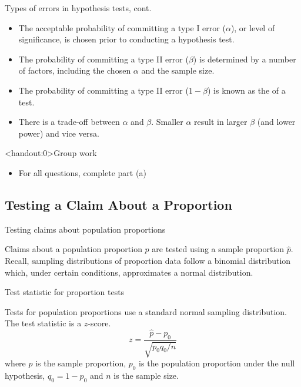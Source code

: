 \documentclass[xcolor=table, handout]{beamer}
\begin{document}
\begin{frame}{Types of errors in hypothesis tests, cont.}
\begin{block}{}
\large
\begin{itemize}
\item The acceptable probability of committing a type I error ($\alpha$), or level of significance,  is chosen prior to conducting a hypothesis test.
\pause\item The probability of committing a type II error ($\beta$) is determined by a number of factors, including the chosen $\alpha$ and the sample size.
\pause\item The probability of  committing a type II error ($1-\beta$) is known as the  of a test.
\pause\item There is a trade-off between $\alpha$ and $\beta$. Smaller $\alpha$ result in larger $\beta$ (and lower power) and vice versa.
\end{itemize}
\end{block}
\end{frame}

\begin{frame}<handout:0>{Group work}
\begin{block}{}
\large
\begin{itemize}
\item For all questions, complete part (a)
\end{itemize}
\end{block}
\end{frame}


\subsection{Testing a Claim About a Proportion}

\begin{frame}{Testing claims about population proportions}
\begin{block}{}
\large
Claims about a population proportion $p$ are tested using a sample proportion $\hat p$.\\
\medskip
Recall, sampling distributions of proportion data follow a binomial distribution which, under certain conditions, approximates a normal distribution.\\
\end{block}
\end{frame}

\begin{frame}{Test statistic for proportion tests}
\begin{block}{}
\large
Tests for population proportions use a standard normal sampling distribution. The test statistic is a $z$-score.
\[z = \frac {\hat p - p_0}{\sqrt{p_0q_0/n}}\]
where $\hat p$ is the sample proportion, $p_0$ is the population proportion under the null hypothesis, $q_0=1-p_0$ and $n$ is the sample size.
\end{block}

\end{frame}
\end{document}
